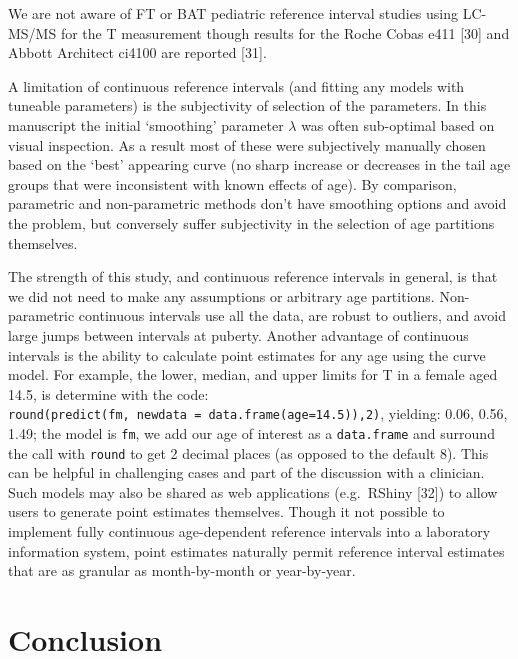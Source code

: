 \documentclass[]{elsarticle} %
\begin{document}
We are not aware of FT or BAT pediatric reference interval studies using
LC-MS/MS for the T measurement though results for the Roche Cobas e411
{[}30{]} and Abbott Architect ci4100 are reported {[}31{]}.

A limitation of continuous reference intervals (and fitting any models
with tuneable parameters) is the subjectivity of selection of the
parameters. In this manuscript the initial `smoothing' parameter
\(\lambda\) was often sub-optimal based on visual inspection. As a
result most of these were subjectively manually chosen based on the
`best' appearing curve (no sharp increase or decreases in the tail age
groups that were inconsistent with known effects of age). By comparison,
parametric and non-parametric methods don't have smoothing options and
avoid the problem, but conversely suffer subjectivity in the selection
of age partitions themselves.

The strength of this study, and continuous reference intervals in
general, is that we did not need to make any assumptions or arbitrary
age partitions. Non-parametric continuous intervals use all the data,
are robust to outliers, and avoid large jumps between intervals at
puberty. Another advantage of continuous intervals is the ability to
calculate point estimates for any age using the curve model. For
example, the lower, median, and upper limits for T in a female aged
14.5, is determine with the code:
\texttt{round(predict(fm,\ newdata\ =\ data.frame(age=14.5)),2)},
yielding: 0.06, 0.56, 1.49; the model is \texttt{fm}, we add our age of
interest as a \texttt{data.frame} and surround the call with
\texttt{round} to get 2 decimal places (as opposed to the default 8).
This can be helpful in challenging cases and part of the discussion with
a clinician. Such models may also be shared as web applications
(e.g.~RShiny {[}32{]}) to allow users to generate point estimates
themselves. Though it not possible to implement fully continuous
age-dependent reference intervals into a laboratory information system,
point estimates naturally permit reference interval estimates that are
as granular as month-by-month or year-by-year.

\hypertarget{conclusion}{%
\section{Conclusion}\label{conclusion}}
\end{document}
